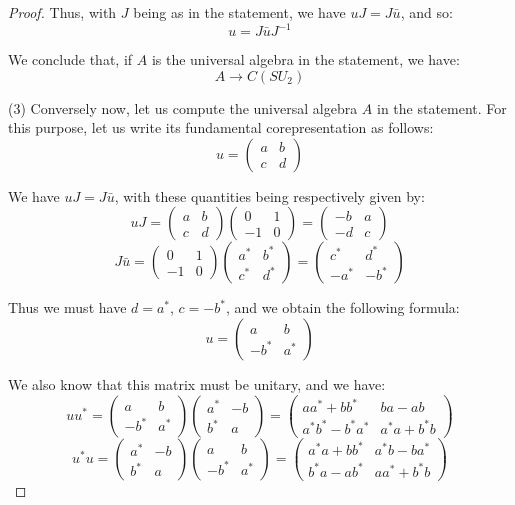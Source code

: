 \documentclass[12pt]{amsbook}
\begin{document}
\begin{proof}
Thus, with $J$ being as in the statement, we have $uJ=J\bar{u}$, and so:
$$u=J\bar{u}J^{-1}$$

We conclude that, if $A$ is the universal algebra in the statement, we have:
$$A\to C(SU_2)$$

(3) Conversely now, let us compute the universal algebra $A$ in the statement. For this purpose, let us write its fundamental corepresentation as follows:
$$u=\begin{pmatrix}a&b\\c&d\end{pmatrix}$$

We have $uJ=J\bar{u}$, with these quantities being respectively given by:
$$uJ=\begin{pmatrix}a&b\\c&d\end{pmatrix}
\begin{pmatrix}0&1\\ -1&0\end{pmatrix}
=\begin{pmatrix}-b&a\\-d&c\end{pmatrix}$$
$$J\bar{u}=\begin{pmatrix}0&1\\ -1&0\end{pmatrix}
\begin{pmatrix}a^*&b^*\\c^*&d^*\end{pmatrix}
=\begin{pmatrix}c^*&d^*\\-a^*&-b^*\end{pmatrix}$$

Thus we must have $d=a^*$, $c=-b^*$, and we obtain the following formula:
$$u=\begin{pmatrix}a&b\\-b^*&a^*\end{pmatrix}$$

We also know that this matrix must be unitary, and we have:
$$uu^*=\begin{pmatrix}a&b\\-b^*&a^*\end{pmatrix}
\begin{pmatrix}a^*&-b\\b^*&a\end{pmatrix}
=\begin{pmatrix}aa^*+bb^*&ba-ab\\a^*b^*-b^*a^*&a^*a+b^*b\end{pmatrix}$$
$$u^*u=\begin{pmatrix}a^*&-b\\b^*&a\end{pmatrix}
\begin{pmatrix}a&b\\-b^*&a^*\end{pmatrix}
=\begin{pmatrix}a^*a+bb^*&a^*b-ba^*\\b^*a-ab^*&aa^*+b^*b\end{pmatrix}$$


\end{proof}
\end{document}
